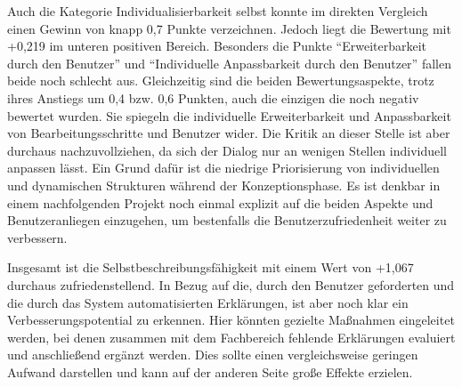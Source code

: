 Auch die Kategorie Individualisierbarkeit selbst konnte im direkten Vergleich einen Gewinn von knapp 0,7 Punkte verzeichnen. Jedoch liegt die Bewertung mit +0,219 im unteren positiven Bereich. Besonders die Punkte \enquote{Erweiterbarkeit durch den Benutzer} und \enquote{Individuelle Anpassbarkeit durch den Benutzer} fallen beide noch schlecht aus. Gleichzeitig sind die beiden Bewertungsaspekte, trotz ihres Anstiegs um 0,4 bzw. 0,6 Punkten, auch die einzigen die noch negativ bewertet wurden. Sie spiegeln die individuelle Erweiterbarkeit und Anpassbarkeit von Bearbeitungsschritte und Benutzer wider. Die Kritik an dieser Stelle ist aber durchaus nachzuvollziehen, da sich der Dialog nur an wenigen Stellen individuell anpassen lässt. Ein Grund dafür ist die niedrige Priorisierung von individuellen und dynamischen Strukturen während der Konzeptionsphase. Es ist denkbar in einem nachfolgenden Projekt noch einmal explizit auf die beiden Aspekte und Benutzeranliegen einzugehen, um bestenfalls die Benutzerzufriedenheit weiter zu verbessern.

Insgesamt ist die Selbstbeschreibungsfähigkeit mit einem Wert von +1,067 durchaus zufriedenstellend. In Bezug auf die, durch den Benutzer geforderten und die durch das System automatisierten Erklärungen, ist aber noch klar ein Verbesserungspotential zu erkennen. Hier könnten gezielte Maßnahmen eingeleitet werden, bei denen zusammen mit dem Fachbereich fehlende Erklärungen evaluiert und anschließend ergänzt werden. Dies sollte einen vergleichsweise geringen Aufwand darstellen und kann auf der anderen Seite große Effekte erzielen.

